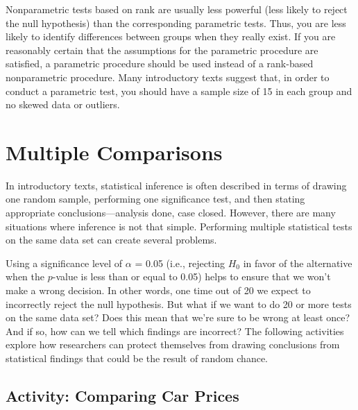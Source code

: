 \documentclass[
]{book}
\begin{document}
Nonparametric tests based on rank are usually less powerful (less likely to reject the null hypothesis) than the corresponding parametric tests. Thus, you are less likely to identify differences between groups when they really exist. If you are reasonably certain that the assumptions for the parametric procedure are satisfied, a parametric procedure should be used instead of a rank-based nonparametric procedure. Many introductory texts suggest that, in order to conduct a parametric test, you should have a sample size of 15 in each group and no skewed data or outliers.

\hypertarget{multiple-comparisons}{%
\section{Multiple Comparisons}\label{multiple-comparisons}}

In introductory texts, statistical inference is often described in terms of drawing one random sample, performing one significance test, and then stating appropriate conclusions---analysis done, case closed. However, there are many situations where inference is not that simple. Performing multiple statistical tests on the same data set can create several problems.

Using a significance level of \(\alpha\) = 0.05 (i.e., rejecting \(H_0\) in favor of the alternative when the \(p\)-value is less than or equal to 0.05) helps to ensure that we won't make a wrong decision. In other words, one time out of 20 we expect to incorrectly reject the null hypothesis. But what if we want to do 20 or more tests on the same data set? Does this mean that we're sure to be wrong at least once? And if so, how can we tell which findings are incorrect? The following activities explore how researchers can protect themselves from drawing conclusions from statistical findings that could be the result of random chance.

\hypertarget{activity-comparing-car-prices}{%
\subsection*{Activity: Comparing Car Prices}\label{activity-comparing-car-prices}}
\end{document}
